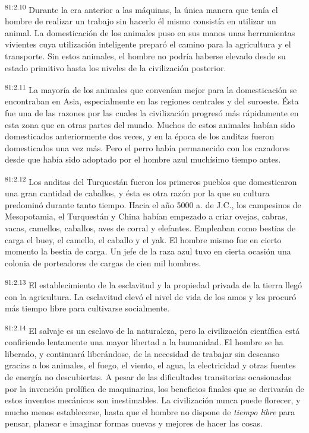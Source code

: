 \documentclass[twoside, 11pt]{book}
\begin{document}
\par
\textsuperscript{81:2.10} Durante la era anterior a las máquinas, la única manera que tenía el hombre de realizar un trabajo sin hacerlo él mismo consistía en utilizar un animal. La domesticación de los animales puso en sus manos unas herramientas vivientes cuya utilización inteligente preparó el camino para la agricultura y el transporte. Sin estos animales, el hombre no podría haberse elevado desde su estado primitivo hasta los niveles de la civilización posterior.

\par
\textsuperscript{81:2.11} La mayoría de los animales que convenían mejor para la domesticación se encontraban en Asia, especialmente en las regiones centrales y del suroeste. Ésta fue una de las razones por las cuales la civilización progresó más rápidamente en esta zona que en otras partes del mundo. Muchos de estos animales habían sido domesticados anteriormente dos veces, y en la época de los anditas fueron domesticados una vez más. Pero el perro había permanecido con los cazadores desde que había sido adoptado por el hombre azul muchísimo tiempo antes.

\par
\textsuperscript{81:2.12} Los anditas del Turquestán fueron los primeros pueblos que domesticaron una gran cantidad de caballos, y ésta es otra razón por la que su cultura predominó durante tanto tiempo. Hacia el año 5000 a. de J.C., los campesinos de Mesopotamia, el Turquestán y China habían empezado a criar ovejas, cabras, vacas, camellos, caballos, aves de corral y elefantes. Empleaban como bestias de carga el buey, el camello, el caballo y el yak. El hombre mismo fue en cierto momento la bestia de carga. Un jefe de la raza azul tuvo en cierta ocasión una colonia de porteadores de cargas de cien mil hombres.

\par
\textsuperscript{81:2.13} El establecimiento de la esclavitud y la propiedad privada de la tierra llegó con la agricultura. La esclavitud elevó el nivel de vida de los amos y les procuró más tiempo libre para cultivarse socialmente.

\par
\textsuperscript{81:2.14} El salvaje es un esclavo de la naturaleza, pero la civilización científica está confiriendo lentamente una mayor libertad a la humanidad. El hombre se ha liberado, y continuará liberándose, de la necesidad de trabajar sin descanso gracias a los animales, el fuego, el viento, el agua, la electricidad y otras fuentes de energía no descubiertas. A pesar de las dificultades transitorias ocasionadas por la invención prolífica de maquinarias, los beneficios finales que se derivarán de estos inventos mecánicos son inestimables. La civilización nunca puede florecer, y mucho menos establecerse, hasta que el hombre no dispone de \textit{tiempo libre} para pensar, planear e imaginar formas nuevas y mejores de hacer las cosas.
\end{document}
